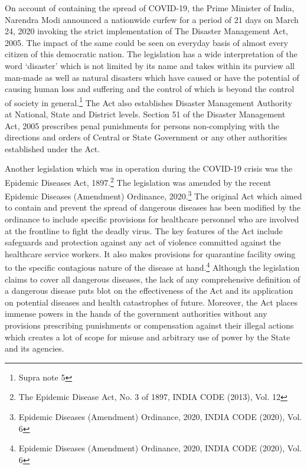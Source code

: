 \begin{multicols}{2}
\vspace{-.05cm}

\noi
On account of containing the spread of COVID-19, the Prime Minister of India, Narendra
Modi announced a nationwide curfew for a period of 21 days on March 24, 2020 invoking
the strict implementation of The Disaster Management Act, 2005. The impact of the same
could be seen on everyday basis of almost every citizen of this democratic nation. The
legislation has a wide interpretation of the word ‘disaster’ which is not limited by its name and takes within its purview all man-made as well as natural disasters which have caused or
have the potential of causing human loss and suffering and the control of which is beyond the
control of society in general.\footnote{Supra note 5} The Act also establishes Disaster Management Authority at
National, State and District levels. Section 51 of the Disaster Management Act, 2005
prescribes penal punishments for persons non-complying with the directions and orders of
Central or State Government or any other authorities established under the Act.

\noi
Another legislation which was in operation during the COVID-19 crisis was the Epidemic
Diseases Act, 1897.\footnote{The Epidemic Disease Act, No. 3 of 1897, INDIA CODE (2013), Vol. 12} The legislation was amended by the recent Epidemic Diseases
(Amendment) Ordinance, 2020.\footnote{Epidemic Diseases (Amendment) Ordinance, 2020, INDIA CODE (2020), Vol. 6} The original Act which aimed to contain and prevent the
spread of dangerous diseases has been modified by the ordinance to include specific
provisions for healthcare personnel who are involved at the frontline to fight the deadly virus.
The key features of the Act include safeguards and protection against any act of violence
committed against the healthcare service workers. It also makes provisions for quarantine
facility owing to the specific contagious nature of the disease at hand.\footnote{Epidemic Diseases (Amendment) Ordinance, 2020, INDIA CODE (2020), Vol. 6} Although the
legislation claims to cover all dangerous diseases, the lack of any comprehensive definition of
a dangerous disease puts blot on the effectiveness of the Act and its application on potential
diseases and health catastrophes of future. Moreover, the Act places immense powers in the
hands of the government authorities without any provisions prescribing punishments or
compensation against their illegal actions which creates a lot of scope for misuse and
arbitrary use of power by the State and its agencies. 


\end{multicols}
